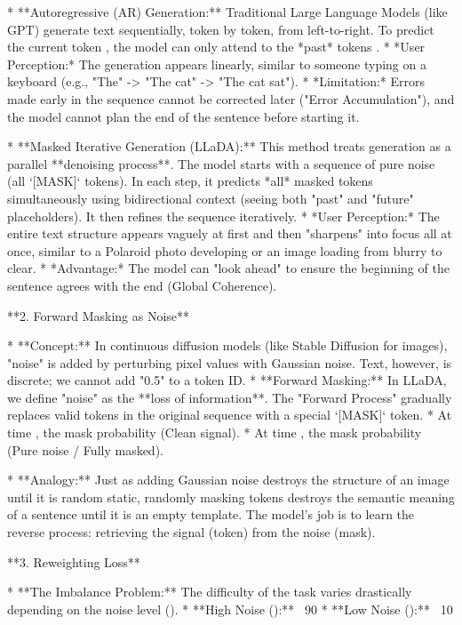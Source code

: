 \documentclass[a4paper,12pt]{article}
\begin{document}
* **Autoregressive (AR) Generation:** Traditional Large Language Models (like GPT) generate text sequentially, token by token, from left-to-right. To predict the current token , the model can only attend to the *past* tokens .
* *User Perception:* The generation appears linearly, similar to someone typing on a keyboard (e.g., "The" -> "The cat" -> "The cat sat").
* *Limitation:* Errors made early in the sequence cannot be corrected later ("Error Accumulation"), and the model cannot plan the end of the sentence before starting it.


* **Masked Iterative Generation (LLaDA):** This method treats generation as a parallel **denoising process**. The model starts with a sequence of pure noise (all `[MASK]` tokens). In each step, it predicts *all* masked tokens simultaneously using bidirectional context (seeing both "past" and "future" placeholders). It then refines the sequence iteratively.
* *User Perception:* The entire text structure appears vaguely at first and then "sharpens" into focus all at once, similar to a Polaroid photo developing or an image loading from blurry to clear.
* *Advantage:* The model can "look ahead" to ensure the beginning of the sentence agrees with the end (Global Coherence).



**2. Forward Masking as Noise**

* **Concept:** In continuous diffusion models (like Stable Diffusion for images), "noise" is added by perturbing pixel values with Gaussian noise. Text, however, is discrete; we cannot add "0.5" to a token ID.
* **Forward Masking:** In LLaDA, we define "noise" as the **loss of information**. The "Forward Process"  gradually replaces valid tokens in the original sequence with a special `[MASK]` token.
* At time , the mask probability  (Clean signal).
* At time , the mask probability  (Pure noise / Fully masked).


* **Analogy:** Just as adding Gaussian noise destroys the structure of an image until it is random static, randomly masking tokens destroys the semantic meaning of a sentence until it is an empty template. The model's job is to learn the reverse process: retrieving the signal (token) from the noise (mask).

**3. Reweighting Loss**

* **The Imbalance Problem:** The difficulty of the task varies drastically depending on the noise level ().
* **High Noise ():** ~90%
* **Low Noise ():** ~10%
\end{document}
